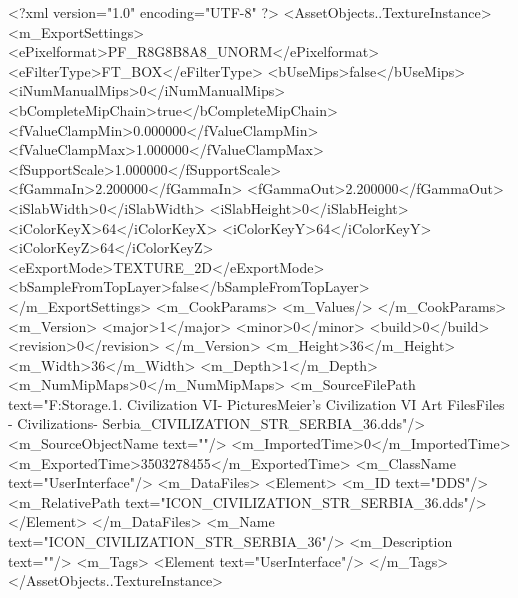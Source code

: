 <?xml version="1.0" encoding="UTF-8" ?>
<AssetObjects..TextureInstance>
	<m_ExportSettings>
		<ePixelformat>PF_R8G8B8A8_UNORM</ePixelformat>
		<eFilterType>FT_BOX</eFilterType>
		<bUseMips>false</bUseMips>
		<iNumManualMips>0</iNumManualMips>
		<bCompleteMipChain>true</bCompleteMipChain>
		<fValueClampMin>0.000000</fValueClampMin>
		<fValueClampMax>1.000000</fValueClampMax>
		<fSupportScale>1.000000</fSupportScale>
		<fGammaIn>2.200000</fGammaIn>
		<fGammaOut>2.200000</fGammaOut>
		<iSlabWidth>0</iSlabWidth>
		<iSlabHeight>0</iSlabHeight>
		<iColorKeyX>64</iColorKeyX>
		<iColorKeyY>64</iColorKeyY>
		<iColorKeyZ>64</iColorKeyZ>
		<eExportMode>TEXTURE_2D</eExportMode>
		<bSampleFromTopLayer>false</bSampleFromTopLayer>
	</m_ExportSettings>
	<m_CookParams>
		<m_Values/>
	</m_CookParams>
	<m_Version>
		<major>1</major>
		<minor>0</minor>
		<build>0</build>
		<revision>0</revision>
	</m_Version>
	<m_Height>36</m_Height>
	<m_Width>36</m_Width>
	<m_Depth>1</m_Depth>
	<m_NumMipMaps>0</m_NumMipMaps>
	<m_SourceFilePath text="F:\Mod Storage\2.1. Civilization VI\Mods\Archive - Pictures\Sid Meier's Civilization VI Art Files\Art Files - Civilizations\Civilization - Serbia\ICON_CIVILIZATION_STR_SERBIA_36.dds"/>
	<m_SourceObjectName text=""/>
	<m_ImportedTime>0</m_ImportedTime>
	<m_ExportedTime>3503278455</m_ExportedTime>
	<m_ClassName text="UserInterface"/>
	<m_DataFiles>
		<Element>
			<m_ID text="DDS"/>
			<m_RelativePath text="ICON_CIVILIZATION_STR_SERBIA_36.dds"/>
		</Element>
	</m_DataFiles>
	<m_Name text="ICON_CIVILIZATION_STR_SERBIA_36"/>
	<m_Description text=""/>
	<m_Tags>
		<Element text="UserInterface"/>
	</m_Tags>
</AssetObjects..TextureInstance>

